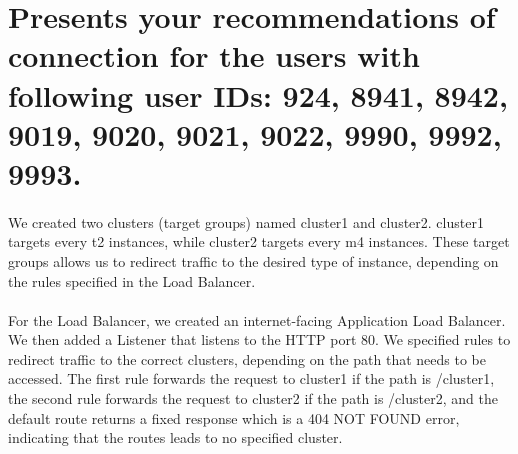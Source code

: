 \section{Presents your recommendations of connection for the users with following user IDs: 924, 8941, 8942,
9019, 9020, 9021, 9022, 9990, 9992, 9993.} \label{T6}

\paragraph{}We created two clusters (target groups) named cluster1 and cluster2. cluster1 targets every t2 instances, while cluster2 targets every m4 instances. These target groups allows us to redirect traffic to the desired type of instance, depending on the rules specified in the Load Balancer.
\paragraph{}For the Load Balancer, we created an internet-facing Application Load Balancer. We then added a Listener that listens to the HTTP port 80. We specified rules to redirect traffic to the correct clusters, depending on the path that needs to be accessed. The first rule forwards the request to cluster1 if the path is /cluster1, the second rule forwards the request to cluster2 if the path is /cluster2, and the default route returns a fixed response which is a 404 NOT FOUND error, indicating that the routes leads to no specified cluster.